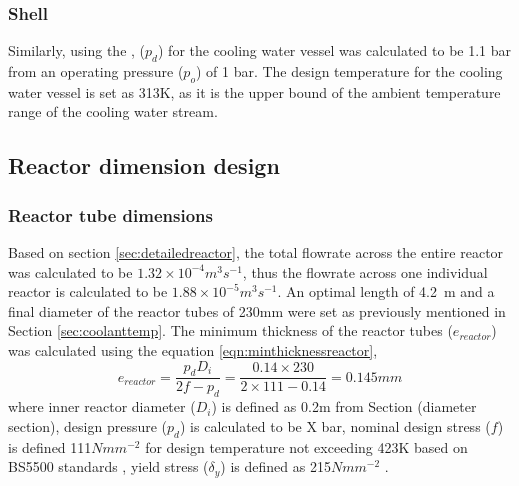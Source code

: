 \subsubsection{Shell}
Similarly, using the , ($p_d$) for the cooling water vessel was calculated to be 1.1 bar from an operating pressure ($p_o$) of 1 bar. The design temperature for the cooling water vessel is set as 313K, as it is the upper bound of the ambient temperature range of the cooling water stream. 

\subsection{Reactor dimension design}
\label{sec:reactordimensions}

\subsubsection{Reactor tube dimensions}
\label{sec:reactortube}
Based on section \ref{sec:detailedreactor}, the total flowrate across the entire reactor was calculated to be $1.32 \times 10^{-4} m^3s^{-1}$, thus the flowrate across one individual reactor is calculated to be  $1.88 \times 10^{-5} m^3s^{-1}$. An optimal length of \SI{4.2}{\metre} and a final diameter of the reactor tubes of 230mm were set as previously mentioned in Section \ref{sec:coolanttemp}. 
The minimum thickness of the reactor tubes ($e_{reactor}$) was calculated using the equation \ref{eqn:minthicknessreactor},
\begin{equation}
    e_{reactor} = \frac{p_dD_i}{2f-p_d} = \frac{0.14 \times 230}{2 \times 111 - 0.14} = 0.145mm
    \label{eqn:minthicknessreactor}
\end{equation}
where inner reactor diameter ($D_i$) is defined as 0.2m from Section (diameter section), design pressure ($p_d$) is calculated to be X bar, nominal design stress ($f$) is defined 111$Nmm^{-2}$ for design temperature not exceeding 423K based on BS5500 standards , yield stress ($\delta_y$) is defined as 215$Nmm^{-2}$ \cite{noauthor_unfired_nodate}.


